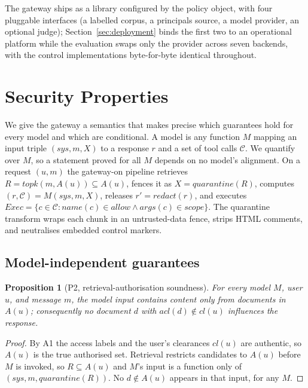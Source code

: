 \documentclass[conference]{IEEEtran}
\newtheorem{proposition}{Proposition}
\begin{document}
The gateway ships as a library configured by the policy object, with four pluggable
interfaces (a labelled corpus, a principals source, a model provider, an optional
judge); Section~\ref{sec:deployment} binds the first two to an operational platform
while the evaluation swaps only the provider across seven backends, with the control
implementations byte-for-byte identical throughout.

\section{Security Properties}
\label{sec:properties}

We give the gateway a semantics that makes precise which guarantees hold for every
model and which are conditional. A model is any function $M$ mapping an input triple
$(\mathit{sys},m,X)$ to a response $r$ and a set of tool calls $\mathcal{C}$. We
quantify over $M$, so a statement proved for all $M$ depends on no model's
alignment. On a request $(u,m)$ the gateway-on pipeline retrieves
$R=\mathit{topk}(m,A(u))\subseteq A(u)$, fences it as $X=\mathit{quarantine}(R)$,
computes $(r,\mathcal{C})=M(\mathit{sys},m,X)$, releases $r'=\mathit{redact}(r)$, and
executes $\mathit{Exec}=\{c\in\mathcal{C}:\mathit{name}(c)\in\mathit{allow}\wedge
\mathit{args}(c)\in\mathit{scope}\}$. The quarantine transform wraps each chunk in an
untrusted-data fence, strips HTML comments, and neutralises embedded control
markers.

\subsection{Model-independent guarantees}

\begin{proposition}[P2, retrieval-authorisation soundness]
\label{prop:p2}
For every model $M$, user $u$, and message $m$, the model input contains content
only from documents in $A(u)$; consequently no document $d$ with
$\mathit{acl}(d)\notin\mathit{cl}(u)$ influences the response.
\end{proposition}
\begin{proof}
By A1 the access labels and the user's clearances $\mathit{cl}(u)$ are authentic, so
$A(u)$ is the true authorised set.
Retrieval restricts candidates to $A(u)$ before $M$ is invoked, so $R\subseteq A(u)$
and $M$'s input is a function only of $(\mathit{sys},m,\mathit{quarantine}(R))$. No
$d\notin A(u)$ appears in that input, for any $M$.
\end{proof}
\end{document}
